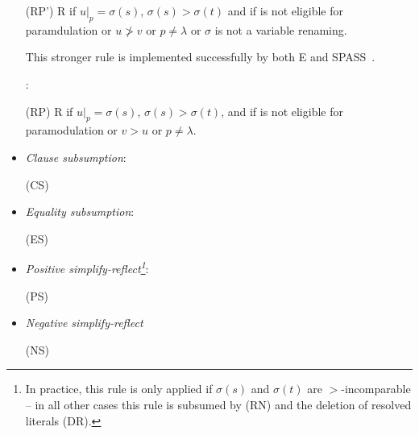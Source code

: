 \documentclass{report}
\begin{document}
\begin{definition}
\begin{itemize}
{     \medskip
     (RP')  {
       \phantom{ae}  \vee R} {if
       $u|_p = \sigma(s)$, $\sigma(s)>\sigma(t)$ and
       if  is not eligible for
       paramdulation or $u \not> v$ or $p \not=
       \lambda$ or $\sigma$ is not a variable renaming.}

     \medskip \noindent This stronger rule is implemented successfully
     by both E and
     SPASS~\cite{Weidenbach:personal-99}.}:

   \bigskip (RP) 
   { \phantom{ae}  \vee
     R} {if $u|_p = \sigma(s)$, $\sigma(s)>\sigma(t)$, and if
      is not eligible for paramodulation or $v > u$ or $p
     \not= \lambda$.}

 \item \emph{Clause subsumption}:

   \bigskip (CS) 

 \item \emph{Equality subsumption}:

   \bigskip (ES) 

 \item \emph{Positive simplify-reflect\footnote{In
       practice, this rule is only applied if $\sigma(s)$ and
       $\sigma(t)$ are $>$-incomparable -- in all other cases this
       rule is subsumed by (RN) and the deletion of resolved literals
       (DR).}}:

   \bigskip (PS) 


 \item \emph{Negative simplify-reflect}

   \bigskip (NS) 

%



\end{itemize}
\end{definition}
\end{document}
